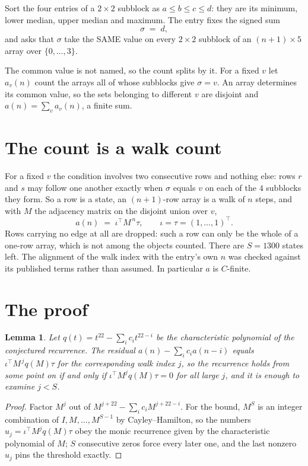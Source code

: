 \documentclass[11pt,a4paper]{article}
\theoremstyle{plain}
\newtheorem{lemma}[theorem]{Lemma}
\theoremstyle{definition}
\begin{document}
Sort the four entries of a $2\times2$ subblock as $a\le b\le c\le d$: they
are its minimum, lower median, upper median and maximum. The entry fixes the signed sum
\[
\sigma\;=\;d,
\]
and asks that $\sigma$ take the SAME value on every $2\times2$ subblock of an
$(n+1)\times5$ array over $\{0,\dots,3\}$.

The common value is not named, so the count splits by it. For a fixed $v$ let $a_v(n)$ count
the arrays all of whose subblocks give $\sigma=v$. An array determines its common value, so
the sets belonging to different $v$ are disjoint and $a(n)=\sum_v a_v(n)$, a finite sum.


\section{The count is a walk count}

For a fixed $v$ the condition involves two consecutive rows and nothing
else: rows $r$ and $s$ may follow one another exactly when $\sigma$ equals $v$ on each of the
$4$ subblocks they form. So a row is a state, an $(n+1)$-row array is a walk of $n$
steps, and with $M$ the adjacency matrix on the disjoint union over $v$,
\[
a(n)\;=\;\iota^{\!\top}M^{\,n}\tau,\qquad\iota=\tau=(1,\dots,1)^{\!\top} .
\]
Rows carrying no edge at all are dropped: such a row can only be the whole of a one-row
array, which is not among the objects counted. There are $S=1300$ states left.
The alignment of the walk index with the entry's own $n$ was checked against its published
terms rather than assumed. In particular $a$ is $C$-finite.

\section{The proof}

\begin{lemma}\label{lem:crit}
Let $q(t)=t^{22}-\sum_i c_it^{22-i}$ be the characteristic polynomial of the
conjectured recurrence. The residual $a(n)-\sum_ic_ia(n-i)$ equals
$\iota^{\!\top}M^{\,j}q(M)\tau$ for the corresponding walk index $j$, so the recurrence
holds from some point on if and only if $\iota^{\!\top}M^{j}q(M)\tau=0$ for all large $j$,
and it is enough to examine $j<S$.
\end{lemma}

\begin{proof}
Factor $M^{j}$ out of $M^{j+22}-\sum_ic_iM^{j+22-i}$. For the bound, $M^{S}$
is an integer combination of $I,M,\dots,M^{S-1}$ by Cayley--Hamilton, so the numbers
$u_j=\iota^{\!\top}M^{j}q(M)\tau$ obey the monic recurrence given by the characteristic
polynomial of $M$; $S$ consecutive zeros force every later one, and the last nonzero $u_j$
pins the threshold exactly.
\end{proof}
\end{document}
